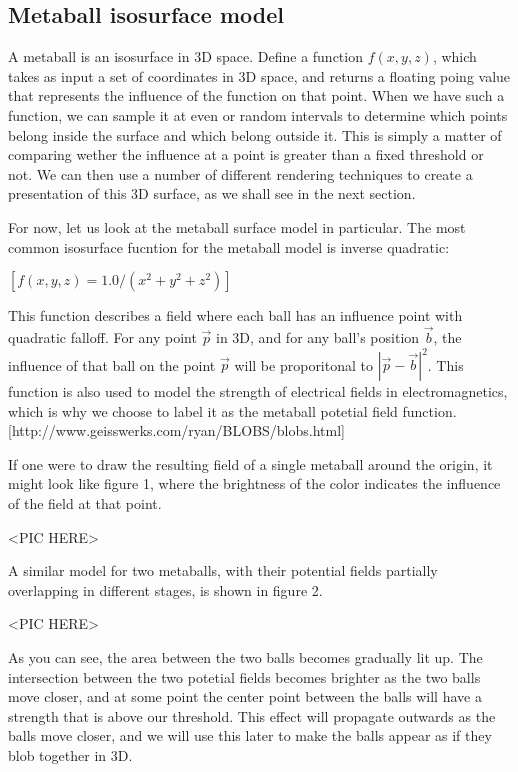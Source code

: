 \documentclass{article}
\begin{document}
        \subsection{Metaball isosurface model}
            A metaball is an isosurface in 3D space. 
            Define a function $f(x,y,z)$, which takes as input a set of coordinates in 3D space, and returns a floating poing value that represents the influence of the function on that point.
            When we have such a function, we can sample it at even or random intervals to determine which points belong inside the surface and which belong outside it.
            This is simply a matter of comparing wether the influence at a point is greater than a fixed threshold or not.
            We can then use a number of different rendering techniques to create a presentation of this 3D surface, as we shall see in the next section.

            For now, let us look at the metaball surface model in particular. The most common isosurface fucntion for the metaball model is inverse quadratic:

            $[f(x,y,z) = 1.0 / (x^2 + y^2 + z^2)]$

            This function describes a field where each ball has an influence point with quadratic falloff.
            For any point $\vec{p}$ in 3D, and for any ball's position $\vec{b}$, the influence of that ball on the point $\vec{p}$ will be proporitonal to $|\vec{p} - \vec{b}|^2$.
            This function is also used to model the strength of electrical fields in electromagnetics, which is why we choose to label it as the metaball potetial field function.
            [http://www.geisswerks.com/ryan/BLOBS/blobs.html]

            If one were to draw the resulting field of a single metaball around the origin, it might look like figure 1, where the brightness of the color indicates the influence of the field at that point.
            
            <PIC HERE>

            A similar model for two metaballs, with their potential fields partially overlapping in different stages, is shown in figure 2.
            
            <PIC HERE>

            As you can see, the area between the two balls becomes gradually lit up.
            The intersection between the two potetial fields becomes brighter as the two balls move closer, and at some point the center point between the balls will have a strength that is above our threshold. This effect will propagate outwards as the balls move closer, and we will use this later to make the balls appear as if they blob together in 3D.
\end{document}
